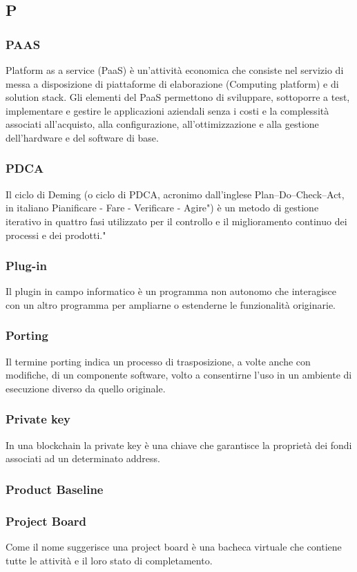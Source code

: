 \subsection*{\textbf{\hfill \Huge{P} \hfill}} 
\subsubsection*{PAAS}
Platform as a service (PaaS) è un'attività economica che consiste nel servizio di messa a disposizione di piattaforme di elaborazione (Computing platform) e di solution stack. Gli elementi del PaaS permettono di sviluppare, sottoporre a test, implementare e gestire le applicazioni aziendali senza i costi e la complessità associati all'acquisto, alla configurazione, all'ottimizzazione e alla gestione dell'hardware e del software di base.
\subsubsection*{PDCA}
Il ciclo di Deming (o ciclo di PDCA, acronimo dall'inglese Plan–Do–Check–Act, in italiano Pianificare - Fare - Verificare - Agire") è un metodo di gestione iterativo in quattro fasi utilizzato per il controllo e il miglioramento continuo dei processi e dei prodotti."
\subsubsection*{Plug-in}
Il plugin in campo informatico è un programma non autonomo che interagisce con un altro programma per ampliarne o estenderne le funzionalità originarie.
\subsubsection*{Porting}
Il termine porting indica un processo di trasposizione, a volte anche con modifiche, di un componente software, volto a consentirne l'uso in un ambiente di esecuzione diverso da quello originale.
\subsubsection*{Private key}
In una blockchain la private key è una chiave che garantisce la proprietà dei fondi associati ad un determinato address.
\subsubsection*{Product Baseline}

\subsubsection*{Project Board}
Come il nome suggerisce una project board è una bacheca virtuale che contiene tutte le attività e il loro stato di completamento.
